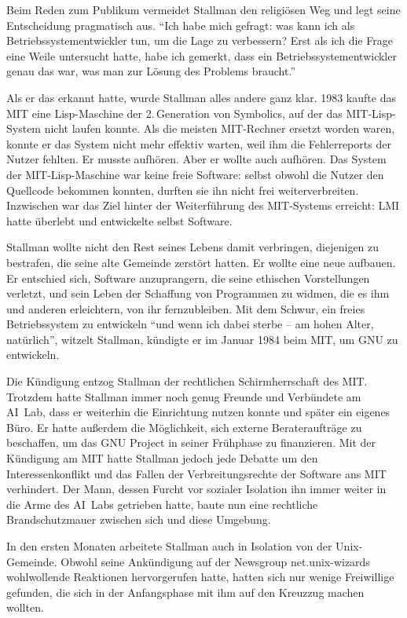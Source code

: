 Beim Reden zum Publikum vermeidet Stallman den religiösen Weg und legt seine Entscheidung pragmatisch aus. "`Ich habe mich gefragt: was kann ich als Betriebssystementwickler tun, um die Lage zu verbessern? Erst als ich die Frage eine Weile untersucht hatte, habe ich gemerkt, dass ein Betriebssystementwickler genau das war, was man zur Lösung des Problems braucht."'

Als er das erkannt hatte, wurde Stallman alles andere ganz klar. 1983 kaufte das  MIT eine Lisp-Maschine der 2.\,Generation von Symbolics, auf der das MIT-Lisp-System nicht laufen konnte. Als die meisten MIT-Rechner ersetzt worden waren, konnte er das System nicht mehr effektiv warten, weil ihm die Fehlerreports der Nutzer fehlten. Er musste aufhören. Aber er wollte auch aufhören. Das System der MIT-Lisp-Maschine war keine freie Software: selbst obwohl die Nutzer den Quellcode bekommen konnten, durften sie ihn nicht frei weiterverbreiten. Inzwischen war das Ziel hinter der Weiterführung des MIT-Systems erreicht: LMI hatte überlebt und entwickelte selbst Software.

Stallman wollte nicht den Rest seines Lebens damit verbringen, diejenigen zu bestrafen, die seine alte Gemeinde zerstört hatten. Er wollte eine neue aufbauen. Er entschied sich, Software anzuprangern, die seine ethischen Vorstellungen verletzt, und sein Leben der Schaffung von Programmen zu widmen, die es ihm und anderen erleichtern, von ihr fernzubleiben. Mit dem Schwur, ein freies Betriebssystem zu entwickeln "`und wenn ich dabei sterbe – am hohen Alter, natürlich"', witzelt Stallman, kündigte er im Januar 1984 beim MIT, um GNU zu entwickeln.

Die Kündigung entzog Stallman der rechtlichen Schirmherrschaft des MIT. Trotzdem hatte Stallman immer noch genug Freunde und Verbündete am AI~Lab, dass er weiterhin die Einrichtung nutzen konnte und später ein eigenes Büro. Er hatte außerdem die Möglichkeit, sich externe Berateraufträge zu beschaffen, um das GNU Project in seiner Frühphase zu finanzieren. Mit der Kündigung am MIT hatte Stallman jedoch jede Debatte um den Interessenkonflikt und das Fallen der Verbreitungsrechte der Software ans MIT verhindert. Der Mann, dessen Furcht vor sozialer Isolation ihn immer weiter in die Arme des AI~Labs getrieben hatte, baute nun eine rechtliche Brandschutzmauer zwischen sich und diese Umgebung.

In den ersten Monaten arbeitete Stallman auch in Isolation von der Unix-Gemeinde. Obwohl seine Ankündigung auf der Newsgroup net.unix-wizards wohlwollende Reaktionen hervorgerufen hatte, hatten sich nur wenige Freiwillige gefunden, die sich in der Anfangsphase mit ihm auf den Kreuzzug machen wollten.

